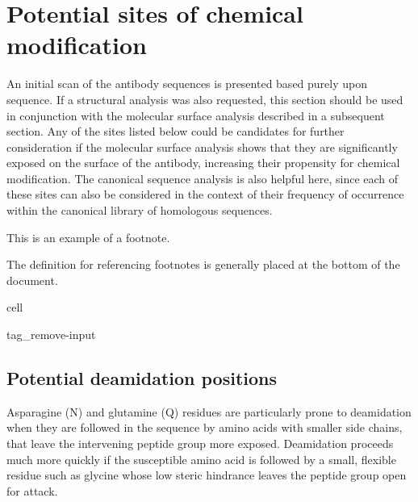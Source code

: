 \documentclass[letterpaper,10pt,english]{jupyterBook}
\begin{document}
\chapter{Potential sites of chemical modification}
\label{\detokenize{ipynb/chapter2:potential-sites-of-chemical-modification}}\label{\detokenize{ipynb/chapter2::doc}}
\sphinxAtStartPar
An initial scan of the antibody sequences is presented based purely upon sequence. If a structural analysis was also requested, this section should be used in conjunction with the molecular surface analysis described in a subsequent section. Any of the sites listed below could be candidates for further consideration if the molecular surface analysis shows that they are significantly exposed on the surface of the antibody, increasing their propensity for chemical modification. The canonical sequence analysis is also helpful here, since each of these sites can also be considered in the context of their frequency of occurrence within the canonical library of homologous sequences.

\sphinxAtStartPar
This is an example of a footnote.%
\begin{footnote}[1]\sphinxAtStartFootnote
The definition for referencing footnotes is generally placed at the bottom of the document.
%
\end{footnote}

\begin{sphinxuseclass}{cell}
\begin{sphinxuseclass}{tag_remove-input}
\end{sphinxuseclass}
\end{sphinxuseclass}

\section{Potential deamidation positions}
\label{\detokenize{ipynb/chapter2:potential-deamidation-positions}}
\sphinxAtStartPar
Asparagine (N) and glutamine (Q) residues are particularly prone to deamidation when they are followed in the sequence by amino acids with smaller side chains, that leave the intervening peptide group more exposed. Deamidation proceeds much more quickly if the susceptible amino acid is followed by a small, flexible residue such as glycine whose low steric hindrance leaves the peptide group open for attack.
\end{document}
